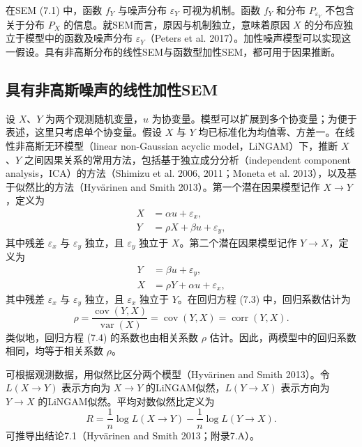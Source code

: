 在SEM (7.1) 中，函数 $f_Y$ 与噪声分布 $\varepsilon_Y$ 可视为机制。函数 $f_Y$ 和分布 $P_{\varepsilon_Y}$ 不包含关于分布 $P_X$ 的信息。就SEM而言，原因与机制独立，意味着原因 $X$ 的分布应独立于模型中的函数及噪声分布 $\varepsilon_Y$（Peters et al. 2017）。加性噪声模型可以实现这一假设。具有非高斯分布的线性SEM与函数型加性SEM，都可用于因果推断。

\subsection{具有非高斯噪声的线性加性SEM}
设 $X$、$Y$ 为两个观测随机变量，$u$ 为协变量。模型可以扩展到多个协变量；为便于表述，这里只考虑单个协变量。假设 $X$ 与 $Y$ 均已标准化为均值零、方差一。在线性非高斯无环模型（linear non-Gaussian acyclic model，LiNGAM）下，推断 $X$、$Y$ 之间因果关系的常用方法，包括基于独立成分分析（independent component analysis，ICA）的方法（Shimizu et al. 2006, 2011；Moneta et al. 2013），以及基于似然比的方法（Hyvärinen and Smith 2013）。第一个潜在因果模型记作 $X\to Y$，定义为
\begin{equation}
\begin{aligned}X&=\alpha u+\varepsilon_x,\\Y&=\rho X+\beta u+\varepsilon_y,\end{aligned}
\tag{7.3}
\end{equation}
其中残差 $\varepsilon_x$ 与 $\varepsilon_y$ 独立，且 $\varepsilon_y$ 独立于 $X$。第二个潜在因果模型记作 $Y\to X$，定义为
\begin{equation}
\begin{aligned}Y&=\beta u+\varepsilon_y,\\X&=\rho Y+\alpha u+\varepsilon_x,\end{aligned}
\tag{7.4}
\end{equation}
其中残差 $\varepsilon_x$ 与 $\varepsilon_y$ 独立，且 $\varepsilon_x$ 独立于 $Y$。在回归方程 (7.3) 中，回归系数估计为
\begin{equation}
\rho=\frac{\operatorname{cov}(Y,X)}{\operatorname{var}(X)}
=\operatorname{cov}(Y,X)=\operatorname{corr}(Y,X).
\tag{7.5}
\end{equation}
类似地，回归方程 (7.4) 的系数也由相关系数 $\rho$ 估计。因此，两模型中的回归系数相同，均等于相关系数 $\rho$。

可根据观测数据，用似然比区分两个模型（Hyvärinen and Smith 2013）。令 $L(X\to Y)$ 表示方向为 $X\to Y$ 的LiNGAM似然，$L(Y\to X)$ 表示方向为 $Y\to X$ 的LiNGAM似然。平均对数似然比定义为
\begin{equation}
R=\frac1n\log L(X\to Y)-\frac1n\log L(Y\to X).
\tag{7.6}
\end{equation}
可推导出结论7.1（Hyvärinen and Smith 2013；附录7.A）。

